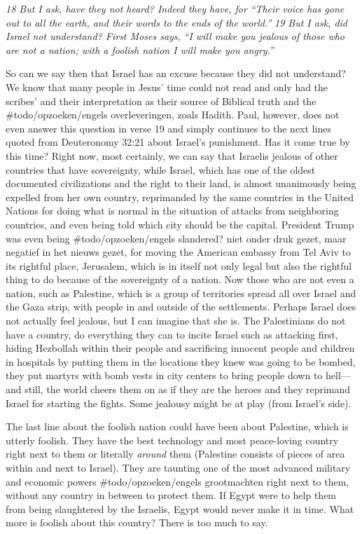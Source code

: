 \emph{18 But I ask, have they not heard? Indeed they have, for}
\emph{``Their voice has gone out to all the earth, and their
words to the ends of the world.''} \emph{19 But I ask, did Israel not
understand? First Moses says,} \emph{``I will make you jealous of those
who are not a nation; with a foolish nation I will make you
angry.''}

So can we say then that Israel has an excuse because they did not
understand? We know that many people in Jesus' time could not read and
only had the scribes' and their interpretation as their source of
Biblical truth and the \#todo/opzoeken/engels overleveringen, zoals
Hadith. Paul, however, does not even answer this question in verse 19
and simply continues to the next lines quoted from Deuteronomy 32:21
about Israel's punishment. Has it come true by this time? Right now,
most certainly, we can say that Israelis jealous of other countries that
have sovereignty, while Israel, which has one of the oldest documented
civilizations and the right to their land, is almost unanimously being
expelled from her own country, reprimanded by the same countries in the
United Nations for doing what is normal in the situation of attacks from
neighboring countries, and even being told which city should be the
capital. President Trump was even being \#todo/opzoeken/engels
slandered? niet onder druk gezet, maar negatief in het nieuws gezet, for
moving the American embassy from Tel Aviv to its rightful place,
Jerusalem, which is in itself not only legal but also the rightful thing
to do because of the sovereignty of a nation. Now those who are not even
a nation, such as Palestine, which is a group of territories spread all
over Israel and the Gaza strip, with people in and outside of the
settlements. Perhaps Israel does not actually feel jealous, but I can
imagine that she is. The Palestinians do not have a country, do
everything they can to incite Israel such as attacking first, hiding
Hezbollah within their people and sacrificing innocent people and
children in hospitals by putting them in the locations they knew was
going to be bombed, they put martyrs with bomb vests in city centers to
bring people down to hell---and still, the world cheers them on as if
they are the heroes and they reprimand Israel for starting the fights.
Some jealousy might be at play (from Israel's side).

The last line about the foolish nation could have been about Palestine,
which is utterly foolish. They have the best technology and most
peace-loving country right next to them or literally \emph{around} them
(Palestine consists of pieces of area within and next to Israel). They
are taunting one of the most advanced military and economic powers
\#todo/opzoeken/engels grootmachten right next to them, without any
country in between to protect them. If Egypt were to help them from
being slaughtered by the Israelis, Egypt would never make it in time.
What more is foolish about this country? There is too much to say.


